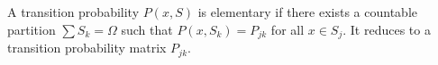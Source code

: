 A transition probability $P(x, S)$ is elementary if there exists a countable partition $\sum S_k = \Omega$ such that $P(x, S_k) = P_{jk}$ for all $x \in S_j$. It reduces to a transition probability matrix $P_{jk}$.
